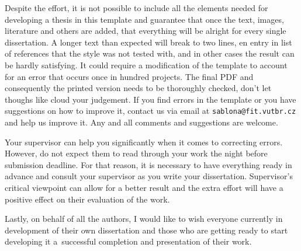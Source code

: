 Despite the effort, it is not possible to include all the elements needed for developing a thesis in this template and guarantee that once the text, images, literature and others are added, that everything will be alright for every single dissertation. A longer text than expected will break to two lines, en entry in list of references that the style was not tested with, and in other cases the result can be hardly satisfying. It could require a modification of the template to account for an error that occurs once in hundred projects. The final PDF and consequently the printed version needs to be thoroughly checked, don't let thoughs like  cloud your judgement. If you find errors in the template or you have suggestions on how to improve it, contact us via email at \texttt{sablona@fit.vutbr.cz} and help us improve it. Any and all comments and suggestions are welcome.

Your supervisor can help you significantly when it comes to correcting errors. However, do not expect them to read through your work the night before submission deadline. For that reason, it is necessary to have everything ready in advance and consult your supervisor as you write your dissertation. Supervisor's critical viewpoint can allow for a better result and the extra effort will have a positive effect on their evaluation of the work.


Lastly, on behalf of all the authors, I would like to wish everyone currently in development of their own dissertation and those who are getting ready to start developing it a~successful completion and presentation of their work.

